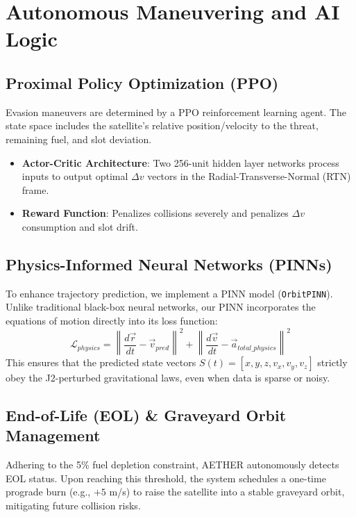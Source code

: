 \documentclass[11pt,a4paper]{article}
\begin{document}
\section{Autonomous Maneuvering and AI Logic}
\label{sec:ai}

\subsection{Proximal Policy Optimization (PPO)}
Evasion maneuvers are determined by a PPO reinforcement learning agent. The state space includes the satellite's relative position/velocity to the threat, remaining fuel, and slot deviation.
\begin{itemize}
    \item \textbf{Actor-Critic Architecture}: Two 256-unit hidden layer networks process inputs to output optimal $\Delta v$ vectors in the Radial-Transverse-Normal (RTN) frame.
    \item \textbf{Reward Function}: Penalizes collisions severely and penalizes $\Delta v$ consumption and slot drift.
\end{itemize}

\subsection{Physics-Informed Neural Networks (PINNs)}
To enhance trajectory prediction, we implement a PINN model (\texttt{OrbitPINN}). Unlike traditional black-box neural networks, our PINN incorporates the equations of motion directly into its loss function:
\begin{equation}
    \mathcal{L}_{physics} = \left\| \frac{d\vec{r}}{dt} - \vec{v}_{pred} \right\|^2 + \left\| \frac{d\vec{v}}{dt} - \vec{a}_{total\_physics} \right\|^2
\end{equation}
This ensures that the predicted state vectors $S(t) = [x, y, z, v_x, v_y, v_z]$ strictly obey the J2-perturbed gravitational laws, even when data is sparse or noisy.

\subsection{End-of-Life (EOL) \& Graveyard Orbit Management}
Adhering to the 5\% fuel depletion constraint, AETHER autonomously detects EOL status. Upon reaching this threshold, the system schedules a one-time prograde burn (e.g., $+5$ m/s) to raise the satellite into a stable graveyard orbit, mitigating future collision risks.
\end{document}
